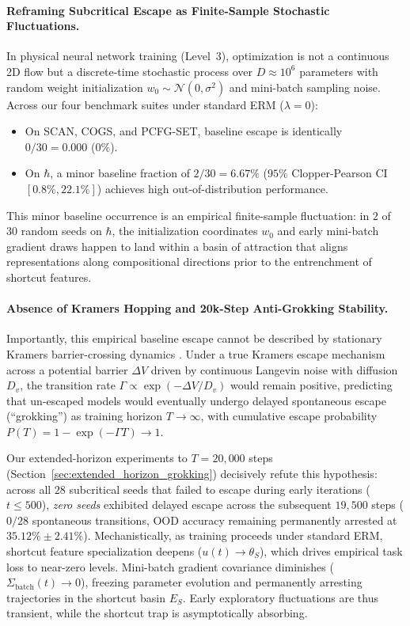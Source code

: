 \documentclass{article}
\theoremstyle{plain}
\theoremstyle{definition}
\begin{document}
\paragraph{Reframing Subcritical Escape as Finite-Sample Stochastic Fluctuations.}
In physical neural network training (Level~3), optimization is not a continuous 2D flow but a discrete-time stochastic process over $D \approx 10^6$ parameters with random weight initialization $w_0 \sim \mathcal{N}(0, \sigma^2)$ and mini-batch sampling noise. Across our four benchmark suites under standard ERM ($\lambda = 0$):
\begin{itemize}[leftmargin=*]
    \item On SCAN, COGS, and PCFG-SET, baseline escape is identically $0/30 = 0.000$ ($0\%$).
    \item On $\hbar$, a minor baseline fraction of $2/30 = 6.67\%$ ($95\%$ Clopper-Pearson CI $[0.8\%, 22.1\%]$) achieves high out-of-distribution performance.
\end{itemize}
This minor baseline occurrence is an empirical finite-sample fluctuation: in $2$ of $30$ random seeds on $\hbar$, the initialization coordinates $w_0$ and early mini-batch gradient draws happen to land within a basin of attraction that aligns representations along compositional directions prior to the entrenchment of shortcut features.

\paragraph{Absence of Kramers Hopping and 20k-Step Anti-Grokking Stability.}
Importantly, this empirical baseline escape cannot be described by stationary Kramers barrier-crossing dynamics \citep{Kramers1940Brownian}. Under a true Kramers escape mechanism across a potential barrier $\Delta V$ driven by continuous Langevin noise with diffusion $D_v$, the transition rate $\Gamma \propto \exp(-\Delta V / D_v)$ would remain positive, predicting that un-escaped models would eventually undergo delayed spontaneous escape (``grokking'') as training horizon $T \to \infty$, with cumulative escape probability $P(T) = 1 - \exp(-\Gamma T) \to 1$.

Our extended-horizon experiments to $T = 20{,}000$ steps (Section~\ref{sec:extended_horizon_grokking}) decisively refute this hypothesis: across all $28$ subcritical seeds that failed to escape during early iterations ($t \le 500$), \emph{zero seeds} exhibited delayed escape across the subsequent $19{,}500$ steps ($0/28$ spontaneous transitions, OOD accuracy remaining permanently arrested at $35.12\% \pm 2.41\%$). Mechanistically, as training proceeds under standard ERM, shortcut feature specialization deepens ($u(t) \to \theta_S$), which drives empirical task loss to near-zero levels. Mini-batch gradient covariance diminishes ($\Sigma_{\text{batch}}(t) \to 0$), freezing parameter evolution and permanently arresting trajectories in the shortcut basin $E_S$. Early exploratory fluctuations are thus transient, while the shortcut trap is asymptotically absorbing.
\end{document}
